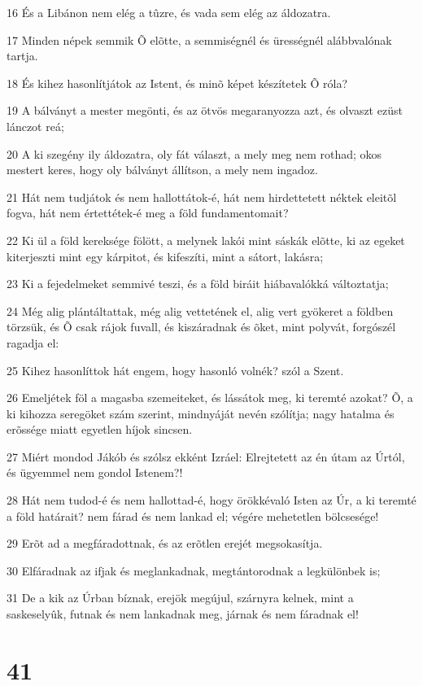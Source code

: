 \par 16 És a Libánon nem elég a tûzre, és vada sem elég az áldozatra.
\par 17 Minden népek semmik Õ elõtte, a semmiségnél és ürességnél alábbvalónak tartja.
\par 18 És kihez hasonlítjátok az Istent, és minõ képet készítetek Õ róla?
\par 19 A bálványt a mester megönti, és az ötvös megaranyozza azt, és olvaszt ezüst lánczot reá;
\par 20 A ki szegény ily áldozatra, oly fát választ, a mely meg nem rothad; okos mestert keres, hogy oly bálványt állítson, a mely nem ingadoz.
\par 21 Hát nem tudjátok és nem hallottátok-é, hát nem hirdettetett néktek eleitõl fogva, hát nem értettétek-é meg a föld fundamentomait?
\par 22 Ki ül a föld kereksége fölött, a melynek lakói mint sáskák elõtte, ki az egeket kiterjeszti mint egy kárpitot, és kifeszíti, mint a sátort, lakásra;
\par 23 Ki a fejedelmeket semmivé teszi, és a föld biráit hiábavalókká változtatja;
\par 24 Még alig plántáltattak, még alig vettetének el, alig vert gyökeret a földben törzsük, és Õ csak rájok fuvall, és kiszáradnak és õket, mint polyvát, forgószél ragadja el:
\par 25 Kihez hasonlíttok hát engem, hogy hasonló volnék? szól a Szent.
\par 26 Emeljétek föl a magasba szemeiteket, és lássátok meg, ki teremté azokat? Õ, a ki kihozza seregöket szám szerint, mindnyáját nevén szólítja; nagy hatalma és erõssége miatt egyetlen híjok sincsen.
\par 27 Miért mondod Jákób és szólsz ekként Izráel: Elrejtetett az én útam az Úrtól, és ügyemmel nem gondol Istenem?!
\par 28 Hát nem tudod-é és nem hallottad-é, hogy örökkévaló Isten az Úr, a ki teremté a föld határait? nem fárad és nem lankad el; végére mehetetlen bölcsesége!
\par 29 Erõt ad a megfáradottnak, és az erõtlen erejét megsokasítja.
\par 30 Elfáradnak az ifjak és meglankadnak, megtántorodnak a legkülönbek is;
\par 31 De a kik az Úrban bíznak, erejök megújul, szárnyra kelnek, mint a saskeselyûk, futnak és nem lankadnak meg, járnak és nem fáradnak el!

\chapter{41}

